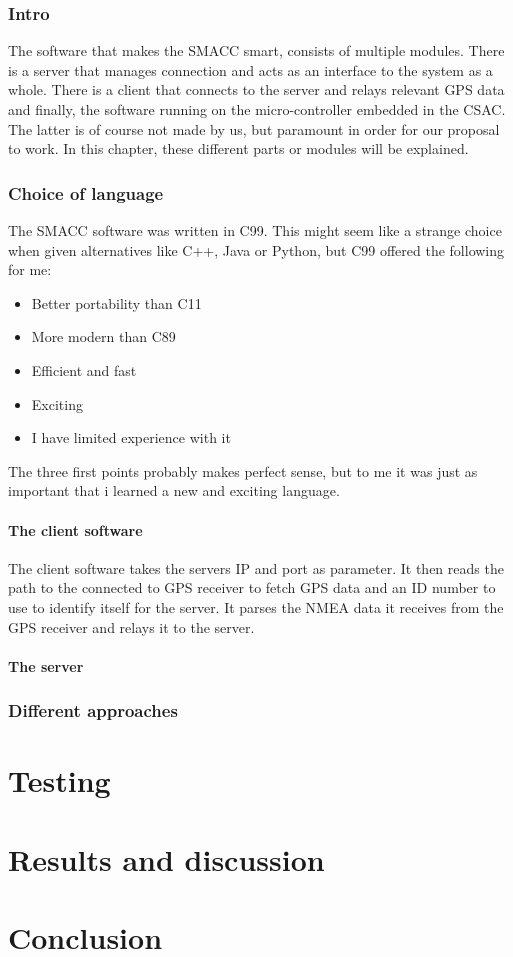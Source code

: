 \documentclass[12pt,english,a4paper]{report}
\begin{document}
\subsection{Intro}
The software that makes the SMACC smart, consists of multiple modules. There is a server that manages connection and acts as an interface to the system as a whole. There is a client that connects to the server and relays relevant GPS data and finally, the software running on the micro-controller embedded in the CSAC. The latter is of course not made by us, but paramount in order for our proposal to work. In this chapter, these different parts or modules will be explained.

\subsection{Choice of language}
The SMACC software was written in C99. This might seem like a strange choice when given alternatives like C++, Java or Python, but C99 offered the following for me:
\begin{itemize}
  \item Better portability than C11
  \item More modern than C89
  \item Efficient and fast
  \item Exciting
  \item I have limited experience with it
\end{itemize}
The three first points probably makes perfect sense, but to me it was just as important that i learned a new and exciting language. 

\subsubsection{The client software}
The client software takes the servers IP and port as parameter. It then reads the path to the connected to GPS receiver to fetch GPS data and an ID number to use to identify itself for the server. It parses the NMEA data it receives from the GPS receiver and relays it to the server. 

\subsubsection{The server}


\subsection{Different approaches}

\newpage
\chapter{Testing}

\newpage
\chapter{Results and discussion}


\newpage
\chapter{Conclusion}

\newpage



\newpage
\printbibliography[title={Complete Bibliography},heading=bibintoc]
\end{document}
